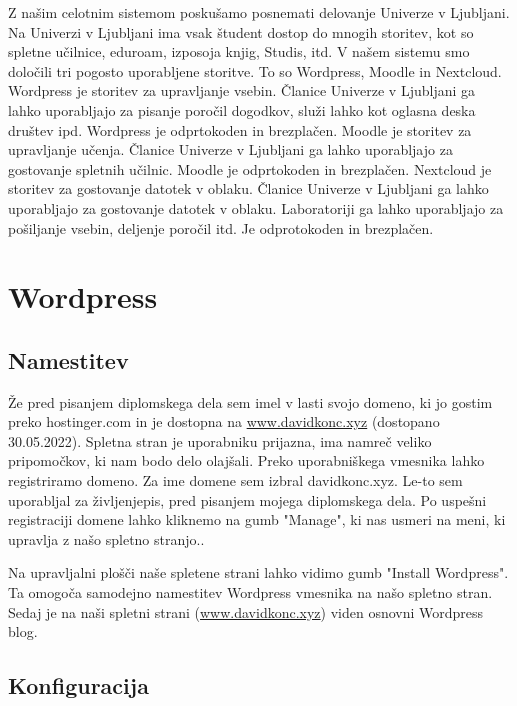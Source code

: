 \documentclass[a4paper,12pt,openright,oneside]{book}
\begin{document}
Z našim celotnim sistemom poskušamo posnemati delovanje Univerze v Ljubljani. Na Univerzi v Ljubljani ima vsak študent dostop do mnogih storitev, kot so spletne učilnice, eduroam, izposoja knjig, Studis, itd. V našem sistemu smo določili tri pogosto uporabljene storitve. To so Wordpress, Moodle in Nextcloud.
\newline
Wordpress je storitev za upravljanje vsebin. Članice Univerze v Ljubljani ga lahko uporabljajo za pisanje poročil dogodkov, služi lahko kot oglasna deska društev ipd. Wordpress je odprtokoden in brezplačen. 
\newline
Moodle je storitev za upravljanje učenja. Članice Univerze v Ljubljani ga lahko uporabljajo za gostovanje spletnih učilnic. Moodle je odprtokoden in brezplačen. 
\newline
Nextcloud je storitev za gostovanje datotek v oblaku. Članice Univerze v Ljubljani ga lahko uporabljajo za gostovanje datotek v oblaku. Laboratoriji ga lahko uporabljajo za pošiljanje vsebin, deljenje poročil itd. Je odprotokoden in brezplačen. 

\section{Wordpress}
\subsection{Namestitev}
Že pred pisanjem diplomskega dela sem imel v lasti svojo domeno, ki jo gostim preko hostinger.com in je dostopna na \href{www.davidkonc.xyz}{www.davidkonc.xyz} (dostopano 30.05.2022). 
Spletna stran je uporabniku prijazna, ima namreč veliko pripomočkov, ki nam bodo delo olajšali.
Preko uporabniškega vmesnika lahko registriramo domeno. Za ime domene sem izbral davidkonc.xyz. Le-to sem uporabljal za življenjepis, pred pisanjem mojega diplomskega dela. 
Po uspešni registraciji domene lahko kliknemo na gumb "Manage", ki nas usmeri na meni, ki upravlja z našo spletno stranjo..

Na upravljalni plošči naše spletene strani lahko vidimo gumb "Install Wordpress". Ta omogoča samodejno namestitev Wordpress vmesnika na našo spletno stran. Sedaj je na naši spletni strani (\href{www.davidkonc.xyz}{www.davidkonc.xyz}) viden osnovni Wordpress blog.
\subsection{Konfiguracija}
\label{authwp}
\end{document}
